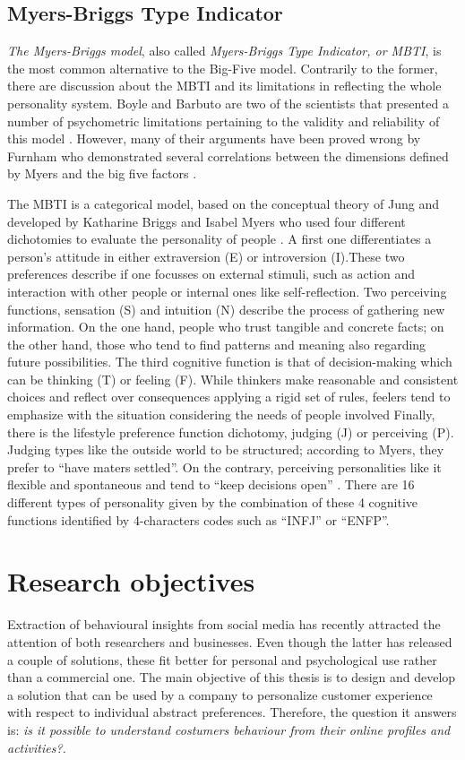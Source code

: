 \subsection{Myers-Briggs Type Indicator}
\textit{The Myers-Briggs model}, also called \textit{Myers-Briggs Type Indicator, or MBTI}, is the most common alternative to the Big-Five model.
Contrarily to the former, there are discussion about the MBTI and its limitations in reflecting the whole personality system. 
Boyle and Barbuto are two of the scientists that presented a number of psychometric limitations pertaining to the validity and reliability of this model \cite{boyle1995myers,barbuto1997critique}.
However, many of their arguments have been proved wrong by Furnham who demonstrated several correlations between the dimensions defined by Myers and the big five factors \cite{furnham1996big}.

The MBTI is a categorical model, based on the conceptual theory of Jung and developed by Katharine Briggs and Isabel Myers who used four different dichotomies to evaluate the personality of people \cite{jung1971personality}. 
A first one differentiates a person's attitude in either extraversion (E) or introversion (I).These two preferences describe if one focusses on external stimuli, such as action and interaction with other people or internal ones like self-reflection.
Two perceiving functions, sensation (S) and intuition (N) describe the process of gathering new information. On the one hand, people who trust tangible and concrete facts; on the other hand, those who tend to find patterns and meaning also regarding future possibilities.
The third cognitive function is that of decision-making which can be thinking (T) or feeling (F). While thinkers make reasonable and consistent choices and reflect over consequences applying a rigid set of rules, feelers tend to emphasize with the situation considering the needs of people involved
Finally, there is the lifestyle preference function dichotomy, judging (J) or perceiving (P). Judging types like the outside world to be structured; according to Myers, they prefer to ``have maters settled''. On the contrary, perceiving personalities like it flexible and spontaneous and tend to ``keep decisions open'' \cite{myers2010gifts}.
There are 16 different types of personality given by the combination of these 4 cognitive functions identified by 4-characters codes such as ``INFJ'' or ``ENFP''.

\section{Research objectives}
Extraction of behavioural insights from social media has recently attracted the attention of both researchers and businesses.
Even though the latter has released a couple of solutions, these fit better for personal and psychological use rather than a commercial one.
The main objective of this thesis is to design and develop a solution that can be used by a company to personalize customer experience with respect to individual abstract preferences.
Therefore, the question it answers is: \textit{is it possible to understand costumers behaviour from their online profiles and activities?.}

